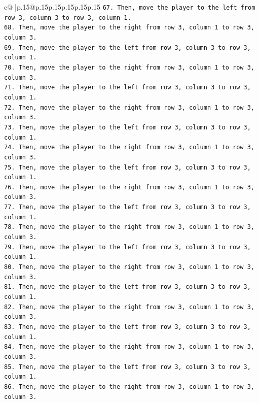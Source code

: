 \documentclass{article}
\begin{document}
{\begin{supertabular}{c@{$\;$}|p{.15\linewidth}@{}p{.15\linewidth}p{.15\linewidth}p{.15\linewidth}p{.15\linewidth}p{.15\linewidth}}
{{{\texttt{67. Then, move the player to the left from row 3, column 3 to row 3, column 1.} \\
\texttt{68. Then, move the player to the right from row 3, column 1 to row 3, column 3.} \\
\texttt{69. Then, move the player to the left from row 3, column 3 to row 3, column 1.} \\
\texttt{70. Then, move the player to the right from row 3, column 1 to row 3, column 3.} \\
\texttt{71. Then, move the player to the left from row 3, column 3 to row 3, column 1.} \\
\texttt{72. Then, move the player to the right from row 3, column 1 to row 3, column 3.} \\
\texttt{73. Then, move the player to the left from row 3, column 3 to row 3, column 1.} \\
\texttt{74. Then, move the player to the right from row 3, column 1 to row 3, column 3.} \\
\texttt{75. Then, move the player to the left from row 3, column 3 to row 3, column 1.} \\
\texttt{76. Then, move the player to the right from row 3, column 1 to row 3, column 3.} \\
\texttt{77. Then, move the player to the left from row 3, column 3 to row 3, column 1.} \\
\texttt{78. Then, move the player to the right from row 3, column 1 to row 3, column 3.} \\
\texttt{79. Then, move the player to the left from row 3, column 3 to row 3, column 1.} \\
\texttt{80. Then, move the player to the right from row 3, column 1 to row 3, column 3.} \\
\texttt{81. Then, move the player to the left from row 3, column 3 to row 3, column 1.} \\
\texttt{82. Then, move the player to the right from row 3, column 1 to row 3, column 3.} \\
\texttt{83. Then, move the player to the left from row 3, column 3 to row 3, column 1.} \\
\texttt{84. Then, move the player to the right from row 3, column 1 to row 3, column 3.} \\
\texttt{85. Then, move the player to the left from row 3, column 3 to row 3, column 1.} \\
\texttt{86. Then, move the player to the right from row 3, column 1 to row 3, column 3.} \\
}}}
\end{supertabular}}
\end{document}

